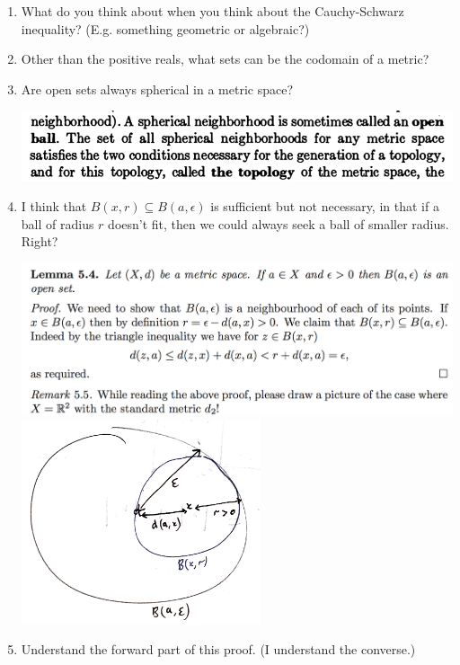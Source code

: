 \documentclass[12pt]{article}
\begin{document}
\begin{enumerate}
\item What do you think about when you think about the Cauchy-Schwarz inequality? (E.g. something
  geometric or algebraic?)
\item Other than the positive reals, what sets can be the codomain of a metric?
\item Are open sets always spherical in a metric space?
  \begin{mdframed}
    \includegraphics[width=400pt]{img/questions-metric-space-open-sets-gelbaum.png}
  \end{mdframed}
\newpage
\item I think that $B(x, r) \subseteq B(a, \epsilon)$ is sufficient but not necessary, in that if a
  ball of radius $r$ doesn't fit, then we could always seek a ball of smaller radius. Right?
  \begin{mdframed}
    \includegraphics[width=400pt]{img/questions-oxford-a2-ball-is-open-proof.png}\\
    \includegraphics[width=200pt]{img/questions-oxford-a2-ball-is-open-proof-diagram.png}
  \end{mdframed}
\item Understand the forward part of this proof. (I understand the converse.)

\end{enumerate}
\end{document}
